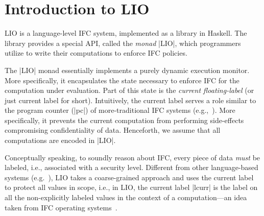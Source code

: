 \section{Introduction to LIO}
\label{sec:background}

LIO is a language-level IFC system, implemented as a library in Haskell.  The
library provides a special API, called the \emph{monad} |LIO|, which 
programmers utilize to write their computations to enforce IFC policies. 
%
%
%

The |LIO| monad essentially implements a purely dynamic execution monitor. More 
specifically, it encapsulates the state necessary to enforce IFC for the computation
under evaluation.
%
Part of this state is the \emph{current floating-label} (or just current label for short).
%
Intuitively, the current label serves a role similar to the program
counter (|pc|) of more-traditional IFC systems
(e.g.,~\cite{FlowCaml}).
%
More specifically, it prevents the current computation from performing 
side-effects compromising confidentiality of data.
Henceforth, we assume that all computations are encoded in |LIO|.

%
%

Conceptually speaking, to soundly reason about IFC, every piece of data 
 \emph{must} be labeled, i.e., associated with a security level.
%
%
%
%
 Different from other language-based systems (e.g.~\cite{myers:jif,FlowCaml}),
 LIO takes a coarse-grained approach and uses the current label to protect all
 values in scope, i.e., in LIO, the current label |lcurr| is the label on all
 the non-explicitly labeled values in the context of a computation---an idea taken
 from IFC operating systems~\cite{Efstathopoulos:2005,zeldovich:histar}.
%
%

